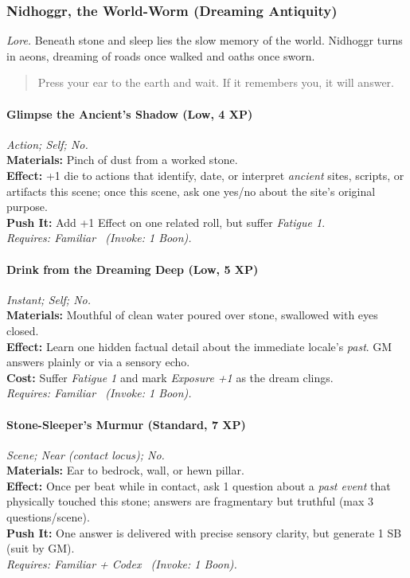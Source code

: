 
\subsubsection{Nidhoggr, the World-Worm (Dreaming Antiquity)}
\textit{Lore.} Beneath stone and sleep lies the slow memory of the world. Nidhoggr turns in aeons, dreaming of roads once walked and oaths once sworn.

\begin{quote}
Press your ear to the earth and wait. If it remembers you, it will answer.
\end{quote}

\paragraph{Glimpse the Ancient's Shadow (Low, 4 XP)} \emph{Action; Self; No.}\\
\textbf{Materials:} Pinch of dust from a worked stone.\\
\textbf{Effect:} +1 die to actions that identify, date, or interpret \emph{ancient} sites, scripts, or artifacts this scene; once this scene, ask one yes/no about the site's original purpose.\\
\textbf{Push It:} Add +1 Effect on one related roll, but suffer \emph{Fatigue 1}.\\
\emph{Requires: Familiar \ (\textit{Invoke:} 1 Boon).}

\paragraph{Drink from the Dreaming Deep (Low, 5 XP)} \emph{Instant; Self; No.}\\
\textbf{Materials:} Mouthful of clean water poured over stone, swallowed with eyes closed.\\
\textbf{Effect:} Learn one hidden factual detail about the immediate locale's \emph{past}. GM answers plainly or via a sensory echo.\\
\textbf{Cost:} Suffer \emph{Fatigue 1} and mark \emph{Exposure +1} as the dream clings.\\
\emph{Requires: Familiar \ (\textit{Invoke:} 1 Boon).}

\paragraph{Stone-Sleeper's Murmur (Standard, 7 XP)} \emph{Scene; Near (contact locus); No.}\\
\textbf{Materials:} Ear to bedrock, wall, or hewn pillar.\\
\textbf{Effect:} Once per beat while in contact, ask 1 question about a \emph{past event} that physically touched this stone; answers are fragmentary but truthful (max 3 questions/scene).\\
\textbf{Push It:} One answer is delivered with precise sensory clarity, but generate 1 SB (suit by GM).\\
\emph{Requires: Familiar + Codex \ (\textit{Invoke:} 1 Boon).}

